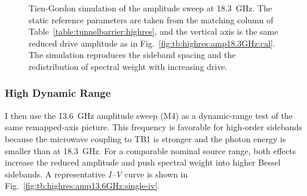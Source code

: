 
        \begin{figure}[p]
            \centering

            \caption{
                Remapped amplitude sweep of TB1 at \qty{18.3}{\giga\hertz}. The same data as in Fig.~\ref{fig:tb:highres:amp18.3GHz:exp} are plotted on the reduced amplitude axis obtained from the pointwise amplitude fits shown in Fig.~\ref{fig:tb:highres:amp18.3GHz:fit}, so the sideband evolution can be compared directly with the Tien-Gordon model.
            }
            \label{fig:tb:highres:amp18.3GHz:cal}

            \vspace{1em}

            \caption{
                Tien-Gordon simulation of the amplitude sweep at \qty{18.3}{\giga\hertz}. The static reference parameters are taken from the matching column of Table~\ref{table:tunnelbarrier:highres}, and the vertical axis is the same reduced drive amplitude as in Fig.~\ref{fig:tb:highres:amp18.3GHz:cal}. The simulation reproduces the sideband spacing and the redistribution of spectral weight with increasing drive.
            }
            \label{fig:tb:highres:amp18.3GHz:sim}
        \end{figure}
    
    \subsubsection*{High Dynamic Range}
    \label{subsec:tb:highres:high-dynamic-range}

        I then use the \qty{13.6}{\giga\hertz} amplitude sweep (M4) as a dynamic-range test of the same remapped-axis picture. This frequency is favorable for high-order sidebands because the microwave coupling to TB1 is stronger and the photon energy is smaller than at \qty{18.3}{\giga\hertz}. For a comparable nominal source range, both effects increase the reduced amplitude and push spectral weight into higher Bessel sidebands. A representative \textit{I--V} curve is shown in Fig.~\ref{fig:tb:highres:amp13.6GHz:single-iv}.

